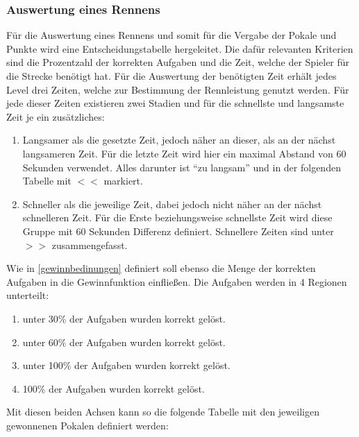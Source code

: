 	\subsubsection{Auswertung eines Rennens}
	Für die Auswertung eines Rennens und somit für die Vergabe der Pokale und Punkte wird  eine Entscheidungstabelle hergeleitet. Die dafür relevanten Kriterien sind die Prozentzahl der korrekten Aufgaben und die Zeit, welche der Spieler für die Strecke benötigt hat.
	Für die Auswertung der benötigten Zeit erhält jedes Level drei Zeiten, welche zur Bestimmung der Rennleistung genutzt werden. Für jede dieser Zeiten existieren zwei Stadien und für die schnellste und langsamste Zeit je ein zusätzliches:
	\begin{enumerate}
		\item{ Langsamer als die gesetzte Zeit, jedoch näher an dieser, als an der nächst langsameren Zeit. Für die letzte Zeit wird hier ein maximal Abstand von $60$ Sekunden verwendet. Alles darunter ist \enquote{zu langsam} und in der folgenden Tabelle mit $<<$ markiert. }
		\item{ Schneller als die jeweilige Zeit, dabei jedoch nicht näher an der nächst schnelleren Zeit. Für die Erste beziehungsweise schnellste Zeit wird diese Gruppe mit $60$ Sekunden Differenz definiert. Schnellere Zeiten sind unter $>>$ zusammengefasst. }
	\end{enumerate}
	Wie in \ref{gewinnbedinungen} definiert soll ebenso die Menge der korrekten Aufgaben in die Gewinnfunktion einfließen. Die Aufgaben werden in 4 Regionen unterteilt:
	\begin{enumerate}
		\item{ unter 30\% der Aufgaben wurden korrekt gelöst. }
		\item{ unter 60\% der Aufgaben wurden korrekt gelöst. }
		\item{ unter 100\% der Aufgaben wurden korrekt gelöst. }
		\item{ 100\% der Aufgaben wurden korrekt gelöst. }
	\end{enumerate}
	Mit diesen beiden Achsen kann so die folgende Tabelle mit den jeweiligen gewonnenen Pokalen definiert werden:

